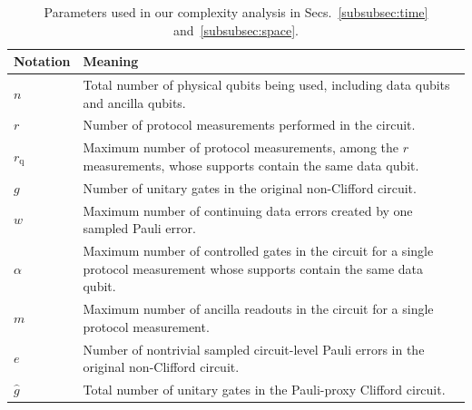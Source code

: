 \documentclass[
 reprint,
 amsmath,amssymb,
 pra,superscriptaddress, nofootinbib
]{revtex4-2}
\theoremstyle{definition}
\theoremstyle{plain}
\begin{document}
{\renewcommand{\arraystretch}{1.5}
\begin{table}
\centering
\caption{Parameters used in our complexity analysis in Secs.~\ref{subsubsec:time} and~\ref{subsubsec:space}.}
\begin{tabular}{ll}
\hline \hline
\parbox[t]{2.5cm}{\raggedright Notation}
& \parbox[t]{14cm}{\raggedright Meaning} \\
\hline

\parbox[t]{2.5cm}{\raggedright $n$}
& \parbox[t]{14cm}{\raggedright Total number of physical qubits being used, including data qubits and ancilla qubits.} \\

\parbox[t]{2.5cm}{\raggedright $r$}
& \parbox[t]{14cm}{\raggedright Number of protocol measurements performed in the circuit.} \\

\parbox[t]{2.5cm}{\raggedright $r_{\mathrm{q}}$}
& \parbox[t]{14cm}{\raggedright Maximum number of protocol measurements, among the $r$ measurements, whose supports contain the same data qubit.} \\

\parbox[t]{2.5cm}{\raggedright $g$}
& \parbox[t]{14cm}{\raggedright Number of unitary gates in the original non-Clifford circuit.} \\

\parbox[t]{2.5cm}{\raggedright $w$}
& \parbox[t]{14cm}{\raggedright Maximum number of continuing data errors created by one sampled Pauli error.} \\

\parbox[t]{2.5cm}{\raggedright $\alpha$}
& \parbox[t]{14cm}{\raggedright Maximum number of controlled gates in the circuit for a single protocol measurement whose supports contain the same data qubit.} \\

\parbox[t]{2.5cm}{\raggedright $m$}
& \parbox[t]{14cm}{\raggedright Maximum number of ancilla readouts in the circuit for a single protocol measurement.} \\

\parbox[t]{2.5cm}{\raggedright $e$}
& \parbox[t]{14cm}{\raggedright Number of nontrivial sampled circuit-level Pauli errors in the original non-Clifford circuit.} \\

\parbox[t]{2.5cm}{\raggedright $\hat{g}$}
& \parbox[t]{14cm}{\raggedright Total number of unitary gates in the Pauli-proxy Clifford circuit.} \\


\end{tabular}
\end{table}}
\end{document}
